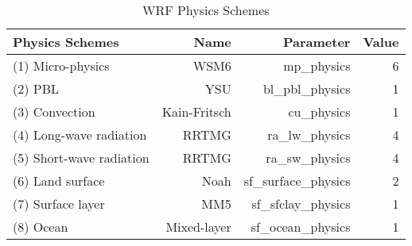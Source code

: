 \documentclass[smallextended]{svjour3}       %
\begin{document}

 

\clearpage
\newpage

\begin{table}[!tbp]
\centering
\begin{tabular}{lrrr}
\toprule
             Physics Schemes &  Name & Parameter & Value \\ 
\midrule
            (1) Micro-physics &     WSM6 &  mp\_physics & 6 \\  
            (2) PBL &    YSU &  bl\_pbl\_physics &  1 \\    
            (3) Convection &   Kain-Fritsch &  cu\_physics & 1 \\    
            (4) Long-wave radiation &    RRTMG &   ra\_lw\_physics & 4 \\    
            (5) Short-wave radiation &    RRTMG &   ra\_sw\_physics & 4 \\    
            (6) Land surface &   Noah &   sf\_surface\_physics & 2 \\    
            (7) Surface layer &    MM5 &  sf\_sfclay\_physics &  1 \\    
            (8) Ocean &    Mixed-layer &  sf\_ocean\_physics &  1 \\    
\bottomrule
\end{tabular}
\caption{WRF Physics Schemes}
\label{wrf_specs}
\end{table}
\end{document}
